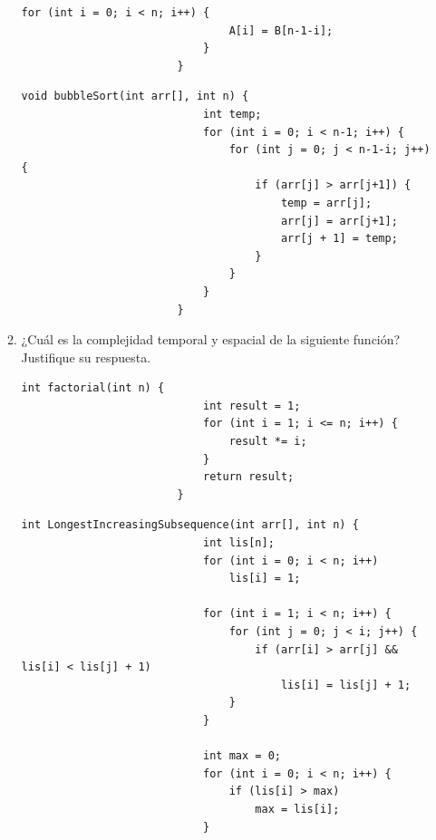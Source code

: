 \documentclass[12pt]{article}
\begin{document}
\begin{titlepage}
\begin{enumerate}
\begin{enumerate}[label*=\arabic*.]
\begin{lstlisting}[xleftmargin=-14.4em]
                            for (int i = 0; i < n; i++) {
                                A[i] = B[n-1-i];
                            }
                        }
                    \end{lstlisting}
                    \begin{lstlisting}[xleftmargin=-14.4em]
                        void bubbleSort(int arr[], int n) {
                            int temp;
                            for (int i = 0; i < n-1; i++) {
                                for (int j = 0; j < n-1-i; j++) {
                                    if (arr[j] > arr[j+1]) {
                                        temp = arr[j];
                                        arr[j] = arr[j+1];
                                        arr[j + 1] = temp;
                                    }
                                }
                            }
                        }
                    \end{lstlisting}
                \item ¿Cuál es la complejidad temporal y espacial de la siguiente función? Justifique su respuesta.
                    \begin{lstlisting}[xleftmargin=-14.4em]
                        int factorial(int n) {
                            int result = 1;
                            for (int i = 1; i <= n; i++) {
                                result *= i;
                            }
                            return result;
                        }
                    \end{lstlisting}
                    \begin{lstlisting}[xleftmargin=-14.4em]
                        int LongestIncreasingSubsequence(int arr[], int n) {
                            int lis[n];
                            for (int i = 0; i < n; i++)
                                lis[i] = 1;
                        
                            for (int i = 1; i < n; i++) {
                                for (int j = 0; j < i; j++) {
                                    if (arr[i] > arr[j] && lis[i] < lis[j] + 1)
                                        lis[i] = lis[j] + 1;
                                }
                            }
                        
                            int max = 0;
                            for (int i = 0; i < n; i++) {
                                if (lis[i] > max)
                                    max = lis[i];
                            }
                        

\end{lstlisting}
\end{enumerate}
\end{enumerate}
\end{titlepage}
\end{document}
